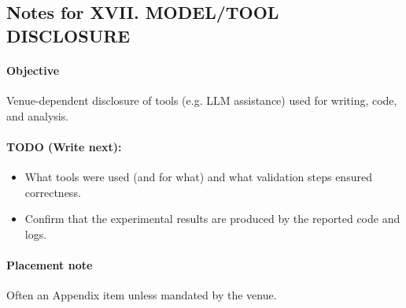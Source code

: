 \subsection*{Notes for XVII. MODEL/TOOL DISCLOSURE}
\paragraph{Objective}
Venue-dependent disclosure of tools (e.g. LLM assistance) used for writing, code, and analysis.

\paragraph{TODO (Write next):}
\begin{itemize}
  \item What tools were used (and for what) and what validation steps ensured correctness.
  \item Confirm that the experimental results are produced by the reported code and logs.
\end{itemize}

\paragraph{Placement note}
Often an Appendix item unless mandated by the venue.
